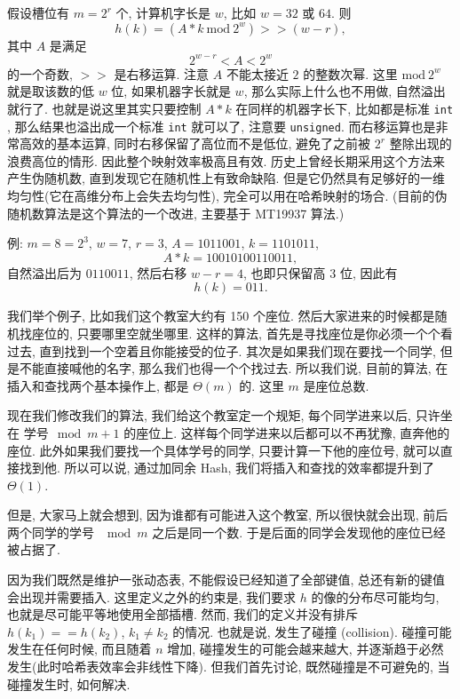 \documentclass[a4paper]{ctexart}
\theoremstyle{definition}
\theoremstyle{definition}
\begin{document}
假设槽位有 $m = 2^r$ 个, 计算机字长是 $w$, 比如 $w = 32$ 或 $64$. 则
$$
h(k) = (A * k ~\mathrm{mod} ~2^w) >> (w - r),
$$
其中 $A$ 是满足
$$
2^{w - r} < A < 2^w
$$
的一个奇数, $>>$ 是右移运算. 注意 $A$ 不能太接近 $2$ 的整数次幂. 这里
$\mathrm{mod}~2^w$ 就是取该数的低 $w$ 位, 如果机器字长就是 $w$, 
那么实际上什么也不用做, 自然溢出就行了. 也就是说这里其实只要控制 $A * k$ 在同样的机器字长下, 
比如都是标准 \verb|int| , 那么结果也溢出成一个标准 \verb|int| 就可以了, 
注意要 \verb|unsigned|. 而右移运算也是非常高效的基本运算, 同时右移保留了高位而不是低位, 
避免了之前被 $2^r$ 整除出现的浪费高位的情形. 因此整个映射效率极高且有效. 
历史上曾经长期采用这个方法来产生伪随机数, 直到发现它在随机性上有致命缺陷. 
但是它仍然具有足够好的一维均匀性(它在高维分布上会失去均匀性), 完全可以用在哈希映射的场合. 
(目前的伪随机数算法是这个算法的一个改进, 主要基于 MT19937 算法.)

例: $m = 8 = 2^3$, $w = 7$, $r = 3$, $A = 1011001$, $k = 1101011$, 
$$
A * k = 10010100110011,
$$
自然溢出后为 $0110011$, 然后右移 $w - r = 4$, 也即只保留高 $3$ 位, 因此有
$$
h(k) = 011.
$$

我们举个例子, 比如我们这个教室大约有 150 个座位. 然后大家进来的时候都是随机找座位的, 
只要哪里空就坐哪里. 这样的算法, 首先是寻找座位是你必须一个个看过去, 直到找到一个空着且你能接受的位子.
其次是如果我们现在要找一个同学, 但是不能直接喊他的名字, 那么我们也得一个个找过去. 所以我们说, 
目前的算法, 在插入和查找两个基本操作上, 都是 $\Theta(m)$ 的. 这里 $m$ 是座位总数.

现在我们修改我们的算法, 我们给这个教室定一个规矩, 每个同学进来以后, 只许坐在 $\mbox{学号} \mod m + 1$ 的座位上.
这样每个同学进来以后都可以不再犹豫, 直奔他的座位. 此外如果我们要找一个具体学号的同学, 只要计算一下他的座位号, 
就可以直接找到他. 所以可以说, 通过加同余 Hash, 我们将插入和查找的效率都提升到了 $\Theta(1)$.

但是, 大家马上就会想到, 因为谁都有可能进入这个教室, 所以很快就会出现, 前后两个同学的学号 $\mod m$ 之后是同一个数. 
于是后面的同学会发现他的座位已经被占据了. 

因为我们既然是维护一张动态表, 不能假设已经知道了全部键值, 总还有新的键值会出现并需要插入. 
这里定义之外的约束是, 我们要求 $h$ 的像的分布尽可能均匀, 也就是尽可能平等地使用全部插槽. 
然而, 我们的定义并没有排斥 $h(k_1) == h(k_2)$, $k_1 \neq k_2$ 的情况. 也就是说, 
发生了碰撞 (collision). 碰撞可能发生在任何时候, 而且随着 $n$ 增加, 碰撞发生的可能会越来越大, 
并逐渐趋于必然发生(此时哈希表效率会非线性下降). 但我们首先讨论, 既然碰撞是不可避免的, 当碰撞发生时, 如何解决.
\end{document}

